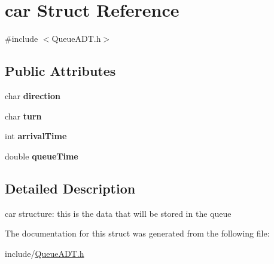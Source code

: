 \hypertarget{structcar}{}\section{car Struct Reference}
\label{structcar}


{\ttfamily \#include $<$Queue\+A\+D\+T.\+h$>$}

\subsection*{Public Attributes}
\begin{DoxyCompactItemize}
\item 
\mbox{\label{structcar_aa51ed785bb8ae116eded5f04fcbbe47a}} 
char {\bfseries direction}
\item 
\mbox{\label{structcar_a73e405e6d1a8301f592696b7d7cf6048}} 
char {\bfseries turn}
\item 
\mbox{\label{structcar_afcd60dcb63cca866fab46dd439766fe6}} 
int {\bfseries arrival\+Time}
\item 
\mbox{\label{structcar_ace0cb16dfb7cf75408f8a6d3887fa049}} 
double {\bfseries queue\+Time}
\end{DoxyCompactItemize}


\subsection{Detailed Description}
car structure\+: this is the data that will be stored in the queue 

The documentation for this struct was generated from the following file\+:\begin{DoxyCompactItemize}
\item 
include/\hyperlink{QueueADT_8h}{Queue\+A\+D\+T.\+h}\end{DoxyCompactItemize}
